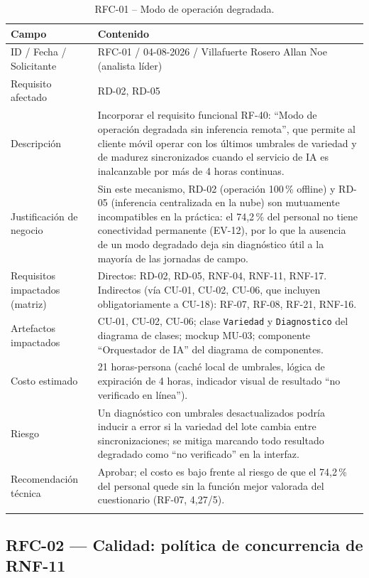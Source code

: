 \documentclass[11pt,a4paper]{article}
\begin{document}
\begin{longtable}{p{3cm}p{10.8cm}}
\toprule
\textbf{Campo} & \textbf{Contenido} \\
\midrule
\endhead
ID / Fecha / Solicitante & RFC-01 / 04-08-2026 / Villafuerte Rosero Allan Noe (analista líder) \\
Requisito afectado & RD-02, RD-05 \\
Descripción & Incorporar el requisito funcional RF-40: ``Modo de operación degradada sin inferencia remota'', que permite al cliente móvil operar con los últimos umbrales de variedad y de madurez sincronizados cuando el servicio de IA es inalcanzable por más de 4 horas continuas. \\
Justificación de negocio & Sin este mecanismo, RD-02 (operación 100\,\% offline) y RD-05 (inferencia centralizada en la nube) son mutuamente incompatibles en la práctica: el 74,2\,\% del personal no tiene conectividad permanente (EV-12), por lo que la ausencia de un modo degradado deja sin diagnóstico útil a la mayoría de las jornadas de campo. \\
Requisitos impactados (matriz) & Directos: RD-02, RD-05, RNF-04, RNF-11, RNF-17. Indirectos (vía CU-01, CU-02, CU-06, que incluyen obligatoriamente a CU-18): RF-07, RF-08, RF-21, RNF-16. \\
Artefactos impactados & CU-01, CU-02, CU-06; clase \texttt{Variedad} y \texttt{Diagnostico} del diagrama de clases; mockup MU-03; componente ``Orquestador de IA'' del diagrama de componentes. \\
Costo estimado & 21 horas-persona (cach\'e local de umbrales, lógica de expiración de 4 horas, indicador visual de resultado ``no verificado en línea''). \\
Riesgo & Un diagnóstico con umbrales desactualizados podría inducir a error si la variedad del lote cambia entre sincronizaciones; se mitiga marcando todo resultado degradado como ``no verificado'' en la interfaz. \\
Recomendación técnica & Aprobar; el costo es bajo frente al riesgo de que el 74,2\,\% del personal quede sin la función mejor valorada del cuestionario (RF-07, 4,27/5). \\
\bottomrule
\caption{RFC-01 -- Modo de operación degradada.}
\end{longtable}

\subsection{RFC-02 --- Calidad: política de concurrencia de RNF-11}
\end{document}
